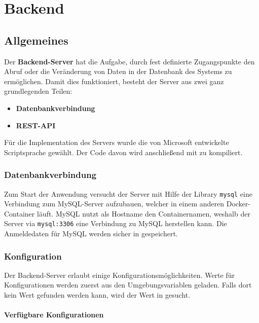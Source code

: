 \part{Backend}
\label{backend}

\chapter{Allgemeines}

Der \textbf{Backend-Server} hat die Aufgabe, durch fest definierte Zugangspunkte den Abruf oder die Veränderung von Daten in der Datenbank des Systems zu ermöglichen. Damit dies funktioniert, besteht der Server aus zwei ganz grundlegenden Teilen:

\begin{itemize}
    \item \textbf{Datenbankverbindung}
    \item \textbf{REST-API}
\end{itemize}

Für die Implementation des Servers wurde die von Microsoft entwickelte Scriptsprache \textit{} gewählt. Der Code davon wird anschließend mit \textit{} zu \textit{} kompiliert.

\section{Datenbankverbindung}

Zum Start der Anwendung versucht der Server mit Hilfe der Library \lstinline{mysql} eine Verbindung zum MySQL-Server aufzubauen, welcher in einem anderen Docker-Container läuft. MySQL nutzt als Hostname den Containernamen, weshalb der Server via \lstinline{mysql:3306} eine Verbindung zu MySQL herstellen kann. Die Anmeldedaten für MySQL werden sicher in \textit{} gespeichert.

\section{Konfiguration}

Der Backend-Server erlaubt einige Konfigurationsmöglichkeiten. Werte für Konfigurationen werden zuerst aus den Umgebungsvariablen geladen. Falls dort kein Wert gefunden werden kann, wird der Wert in \textit{} gesucht.

\subsection{Verfügbare Konfigurationen}

